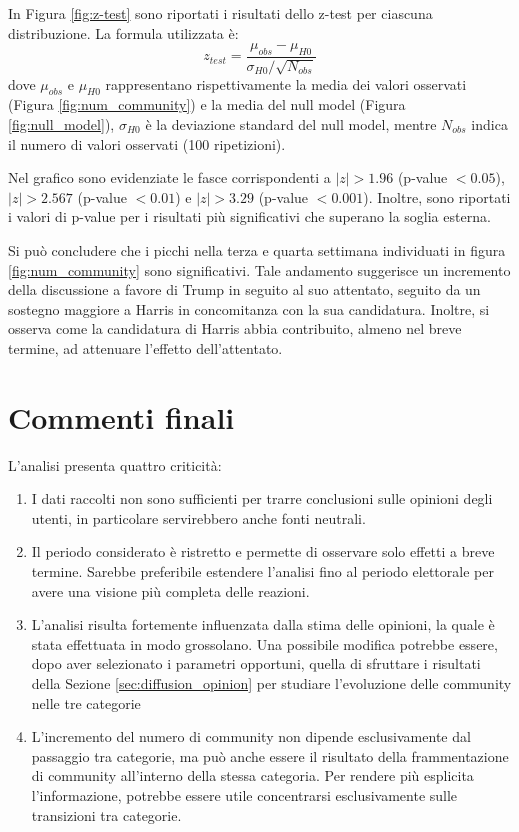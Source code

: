 \documentclass[sigchi]{acmart}
\begin{document}
In Figura \ref{fig:z-test} sono riportati i risultati dello z-test per ciascuna distribuzione. La formula utilizzata è:
\begin{equation}
    z_{test} = \frac{\mu_{obs} - \mu_{H0}}{\sigma_{H0}/\sqrt{N_{obs}}}
\end{equation}
dove $\mu_{obs}$ e $\mu_{H0}$ rappresentano rispettivamente la media dei valori osservati (Figura \ref{fig:num_community}) e la media del null model (Figura \ref{fig:null_model}), $\sigma_{H0}$ è la deviazione standard del null model, mentre $N_{obs}$ indica il numero di valori osservati (100 ripetizioni).

Nel grafico sono evidenziate le fasce corrispondenti a $|z| > 1.96$ (p-value $< 0.05$), $|z| > 2.567$ (p-value $< 0.01$) e $|z| > 3.29$ (p-value $< 0.001$). Inoltre, sono riportati i valori di p-value per i risultati più significativi che superano la soglia esterna.

Si può concludere che i picchi nella terza e quarta settimana individuati in figura \ref{fig:num_community} sono significativi.  Tale andamento suggerisce un incremento della discussione a favore di Trump in seguito al suo attentato, seguito da un sostegno maggiore a Harris in concomitanza con la sua candidatura. Inoltre, si osserva come la candidatura di Harris abbia contribuito, almeno nel breve termine, ad attenuare l'effetto dell'attentato.

\section{Commenti finali}\label{sec:conclusioni}
L'analisi presenta quattro criticità:
\begin{enumerate}
    \item I dati raccolti non sono sufficienti per trarre conclusioni sulle opinioni degli utenti, in particolare servirebbero anche fonti neutrali.
    \item Il periodo considerato è ristretto e permette di osservare solo effetti a breve termine. Sarebbe preferibile estendere l'analisi fino al periodo elettorale per avere una visione più completa delle reazioni.
    \item L'analisi risulta fortemente influenzata dalla stima delle opinioni, la quale è stata effettuata in modo grossolano. Una possibile modifica potrebbe essere, dopo aver selezionato i parametri opportuni, quella di sfruttare i risultati della Sezione \ref{sec:diffusion_opinion} per studiare l'evoluzione delle community nelle tre categorie
    \item L'incremento del numero di community non dipende esclusivamente dal passaggio tra categorie, ma può anche essere il risultato della frammentazione di community all'interno della stessa categoria. Per rendere più esplicita l'informazione, potrebbe essere utile concentrarsi esclusivamente sulle transizioni tra categorie.
\end{enumerate}




\end{document}
